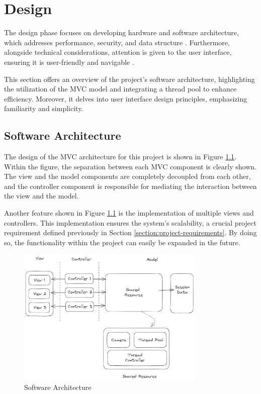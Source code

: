 \chapter{Design}
\label{chapter:design}

The design phase focuses on developing hardware and software architecture, which addresses performance, security, and data structure \cite{Hausen}. Furthermore, alongside technical considerations, attention is given to the user interface, ensuring it is user-friendly and navigable \cite{Hausen}.

This section offers an overview of the project's software architecture, highlighting the utilization of the MVC model and integrating a thread pool to enhance efficiency. Moreover, it delves into user interface design principles, emphasizing familiarity and simplicity.

\section{Software Architecture}
\label{sec:software-architecture}

The design of the MVC architecture for this project is shown in Figure \ref{fig:architechture}. Within the figure, the separation between each MVC component is clearly shown. The view and the model components are completely decoupled from each other, and the controller component is responsible for mediating the interaction between the view and the model.

Another feature shown in Figure \ref{fig:architechture} is the implementation of multiple views and controllers. This implementation ensures the system's scalability, a crucial project requirement defined previously in Section \ref{section:project-requirements}. By doing so, the functionality within the project can easily be expanded in the future.

\begin{figure}[!ht]
    \centering
    \includegraphics[width=0.8\textwidth]{texs/Part2/chapter3/image/architecture.png}
    \caption{Software Architecture}
    \label{fig:architechture}
\end{figure}

